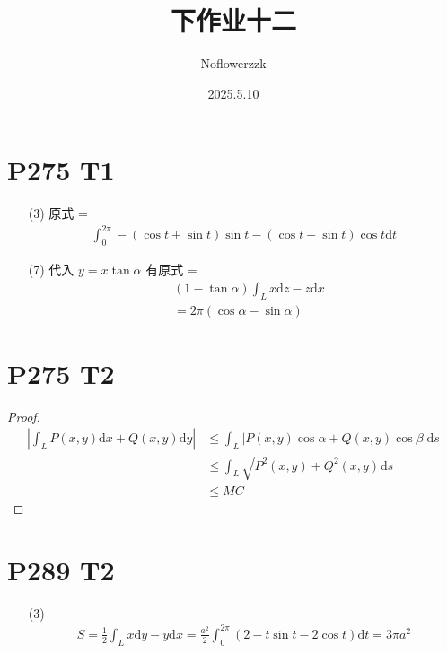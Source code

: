 \documentclass{article}
\title{下作业十二}
\author{Noflowerzzk}
\date{2025.5.10}
\newcommand{\dd}{\mathrm{d}}
\begin{document}
\maketitle

\section*{P275 T1}

\begin{itemize}
    \item [(3)] 原式 = \begin{align*}
        \int_{0}^{2\pi}-(\cos t + \sin t)\sin t - (\cos t - \sin t)\cos t \dd t
    \end{align*}
    \item [(7)] 代入 $y = x\tan \alpha$ 有原式 = \begin{align*}
        &(1 - \tan \alpha)\int_L x \dd z - z \dd x \\
        &= 2\pi (\cos \alpha - \sin \alpha)
    \end{align*}
\end{itemize}

\section*{P275 T2}

\begin{proof}
    \begin{align*}
        \left\lvert \int_L P(x, y)\dd x + Q(x, y) \dd y\right\rvert &\leq \int_L \left\lvert P(x, y)\cos \alpha + Q(x, y)\cos \beta\right\rvert \dd s \\
        &\leq \int_L \sqrt{P^2(x, y) + Q^2(x, y)} \dd s \\
        &\leq MC
    \end{align*}
\end{proof}

\section*{P289 T2}

\begin{itemize}
    \item [(3)] \begin{align*}
        S = \frac{1}{2}\int_L x \dd y - y \dd x = \frac{a^2}{2}\int_{0}^{2\pi}(2 - t \sin t - 2 \cos t) \dd t = 3\pi a^2
    \end{align*}
\end{itemize}
\end{document}
